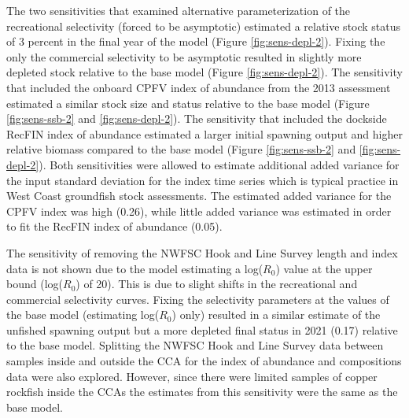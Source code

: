 \documentclass[11pt,
  english,
  a4paper,
]{article}
\begin{document}
\leavevmode\tagmcend\tagstructend\par


The two sensitivities that examined alternative parameterization of the recreational selectivity (forced to be asymptotic) estimated a relative stock status of 3 percent in the final year of the model (Figure \ref{fig:sens-depl-2}). Fixing the only the commercial selectivity to be asymptotic resulted in slightly more depleted stock relative to the base model (Figure \ref{fig:sens-depl-2}). The sensitivity that included the onboard CPFV index of abundance from the 2013 assessment estimated a similar stock size and status relative to the base model (Figure \ref{fig:sens-ssb-2} and \ref{fig:sens-depl-2}). The sensitivity that included the dockside RecFIN index of abundance estimated a larger initial spawning output and higher relative biomass compared to the base model (Figure \ref{fig:sens-ssb-2} and \ref{fig:sens-depl-2}). Both sensitivities were allowed to estimate additional added variance for the input standard deviation for the index time series which is typical practice in West Coast groundfish stock assessments. The estimated added variance for the CPFV index was high (0.26), while little added variance was estimated in order to fit the RecFIN index of abundance (0.05).

\leavevmode\tagmcend\tagstructend\par


The sensitivity of removing the NWFSC Hook and Line Survey length and index data is not shown due to the model estimating a log({\(R_0\)\leavevmode\tagmcend\tagstructend}) value at the upper bound (log({\(R_0\)\leavevmode\tagmcend\tagstructend}) of 20). This is due to slight shifts in the recreational and commercial selectivity curves. Fixing the selectivity parameters at the values of the base model (estimating log({\(R_0\)\leavevmode\tagmcend\tagstructend}) only) resulted in a similar estimate of the unfished spawning output but a more depleted final status in 2021 (0.17) relative to the base model. Splitting the NWFSC Hook and Line Survey data between samples inside and outside the CCA for the index of abundance and compositions data were also explored. However, since there were limited samples of copper rockfish inside the CCAs the estimates from this sensitivity were the same as the base model.
\end{document}
